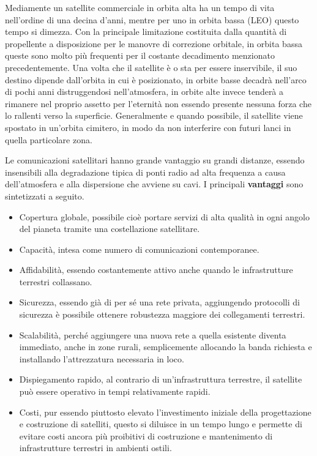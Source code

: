 \documentclass[a4paper]{article}
\begin{document}
			Mediamente un satellite commerciale in orbita alta ha un tempo di vita nell'ordine di una decina d'anni, mentre per uno in orbita bassa (LEO) questo tempo si dimezza. Con la principale limitazione costituita dalla quantità di propellente a disposizione per le manovre di correzione orbitale, in orbita bassa queste sono molto più frequenti per il costante decadimento menzionato precedentemente. Una volta che il satellite è o sta per essere inservibile, il suo destino dipende dall'orbita in cui è posizionato, in orbite basse decadrà nell'arco di pochi anni distruggendosi nell'atmosfera, in orbite alte invece tenderà a rimanere nel proprio assetto per l'eternità non essendo presente nessuna forza che lo rallenti verso la superficie. Generalmente e quando possibile, il satellite viene spostato in un'orbita cimitero, in modo da non interferire con futuri lanci in quella particolare zona. 
			
			
			Le comunicazioni satellitari hanno grande vantaggio su grandi distanze, essendo insensibili alla degradazione tipica di ponti radio ad alta frequenza a causa dell'atmosfera e alla dispersione che avviene su cavi.
			I principali {\bf vantaggi} sono sintetizzati a seguito. 
			\begin{itemize}
				\item Copertura globale, possibile cioè portare servizi di alta qualità in ogni angolo del pianeta tramite una costellazione satellitare. 
				\item Capacità, intesa come numero di comunicazioni contemporanee.
				\item Affidabilità, essendo costantemente attivo anche quando le infrastrutture terrestri collassano.
				\item Sicurezza, essendo già di per sé una rete privata, aggiungendo protocolli di sicurezza è possibile ottenere robustezza maggiore dei collegamenti terrestri.
				\item Scalabilità, perché aggiungere una nuova rete a quella esistente diventa immediato, anche in zone rurali, semplicemente allocando la banda richiesta e installando l'attrezzatura necessaria in loco.
				\item Dispiegamento rapido, al contrario di un'infrastruttura terrestre, il satellite può essere operativo in tempi relativamente rapidi.				
				\item Costi, pur essendo piuttosto elevato l'investimento iniziale della progettazione e costruzione di satelliti, questo si diluisce in un tempo lungo e permette di evitare costi ancora più proibitivi di costruzione e mantenimento di infrastrutture terrestri in ambienti ostili.				
			\end{itemize} 
		
\end{document}
